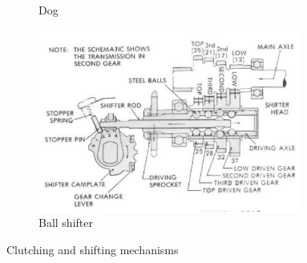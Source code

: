 \begin{figure}[H]
\begin{subfigure}[b]{.32\linewidth}
		\caption{Dog}
	\end{subfigure}
	
	\begin{subfigure}[b]{.60\linewidth}
		\includegraphics[width=0.95\textwidth]{imgs/ball_shifter.png}
		\caption{Ball shifter}
	\end{subfigure}
	\caption{Clutching and shifting mechanisms}
\end{figure}

